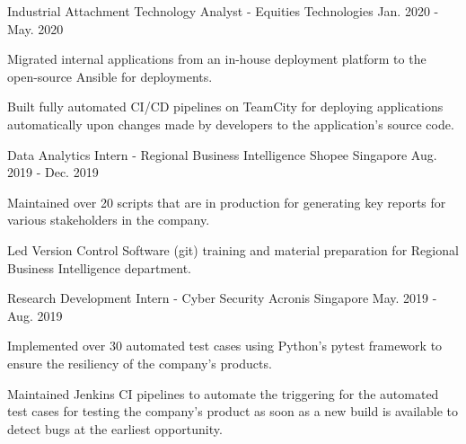 \begin{cventries}
  \cventry
    {Industrial Attachment Technology Analyst - Equities Technologies} %
    {} %
    {} %
    {Jan. 2020 - May. 2020} %
    {
      \begin{cvitems} %
        \item {Migrated internal applications from an in-house deployment platform to the open-source Ansible for deployments.}
        \item {Built fully automated CI/CD pipelines on TeamCity for deploying applications automatically upon changes made by developers to the application's source code.}
      \end{cvitems}
    }



  \cventry
    {Data Analytics Intern - Regional Business Intelligence} %
    {Shopee} %
    {Singapore} %
    {Aug. 2019 - Dec. 2019} %
    {
      \begin{cvitems} %
        \item {Maintained over 20 scripts that are in production for generating key reports for various stakeholders in the company.}
        \item {Led Version Control Software (git) training and material preparation for Regional Business Intelligence department.}
      \end{cvitems}
    }

  \cventry
    {Research Development Intern - Cyber Security} %
    {Acronis} %
    {Singapore} %
    {May. 2019 - Aug. 2019} %
    {
      \begin{cvitems} %
        \item {Implemented over 30 automated test cases using Python’s pytest framework to ensure the resiliency of the company’s products.}
        \item {Maintained Jenkins CI pipelines to automate the triggering for the automated test cases for testing the company’s product as soon as a new build is available to detect bugs at the earliest opportunity.}
      \end{cvitems}
    }


\end{cventries}
